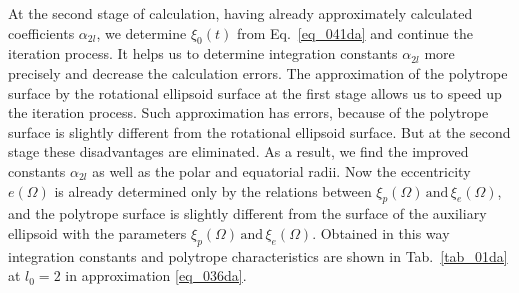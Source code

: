\documentclass{caosp308}
\begin{document}
At the second stage of calculation, having already approximately calculated coefficients $\alpha_{2l}$, we determine $\xi_0(t)$ from Eq.~\eqref{eq_041da} and continue the iteration process. It helps us to determine integration constants $\alpha_{2l}$ more precisely and decrease the calculation errors. The approximation of the polytrope surface by the rotational ellipsoid surface at the first stage allows us to speed up the iteration process. Such approximation has errors, because of the polytrope surface is slightly different from the rotational ellipsoid surface. But at the second stage these disadvantages are eliminated.  
As a result, we find the improved constants $\alpha_{2l}$ as well as the polar and equatorial radii. Now the eccentricity $e(\Omega)$ is already determined only by the relations between $\xi_{p}(\Omega)\,\text{and}\,\xi_{e}(\Omega)$, and the polytrope surface is slightly different from the surface of the auxiliary ellipsoid with the parameters $\xi_{p}(\Omega)\,\text{and}\,\xi_{e}(\Omega)$. Obtained in this way integration constants and polytrope characteristics are shown in Tab.~\ref{tab_01da} at $l_0=2$ in approximation \eqref{eq_036da}.
\end{document}
